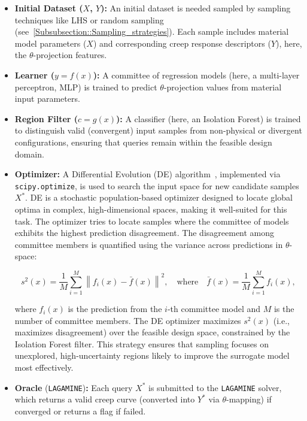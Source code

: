 \documentclass[class=scrbook, crop=false]{standalone}
\begin{document}
	\begin{itemize}
		\item \textbf{Initial Dataset ($X$, $Y$):} An initial dataset is needed sampled by sampling techniques like LHS or random sampling (see~\ref{Subsubsection::Sampling_strategies}). Each sample includes material model parameters ($X$) and corresponding creep response descriptors ($Y$), here, the $\theta$-projection features.	
		
		\item \textbf{Learner ($y = f(x)$):} A committee of regression models (here, a multi-layer perceptron, MLP) is trained to predict $\theta$-projection values from material input parameters.
		
		\item \textbf{Region Filter ($c = g(x)$):} A classifier (here, an Isolation Forest) is trained to distinguish valid (convergent) input samples from non-physical or divergent configurations, ensuring that queries remain within the feasible design domain.
		
		\item \textbf{Optimizer:} A Differential Evolution (DE) algorithm~\cite{storn1997differential}, implemented via \texttt{scipy.optimize}, is used to search the input space for new candidate samples $X^*$. DE is a stochastic population-based optimizer designed to locate global optima in complex, high-dimensional spaces, making it well-suited for this task. The optimizer tries to locate samples where the committee of models exhibits the highest prediction disagreement. The disagreement among committee members is quantified using the variance across predictions in $\theta$-space:
		
		\begin{equation}
			s^2(x) = \frac{1}{M} \sum_{i=1}^M \left\| f_i(x) - \bar{f}(x) \right\|^2, \quad \text{where} \quad \bar{f}(x) = \frac{1}{M} \sum_{i=1}^M f_i(x),
		\end{equation}
		
		where $f_i(x)$ is the prediction from the $i$-th committee model and $M$ is the number of committee members. The DE optimizer maximizes \( s^2(x) \) (i.e., maximizes disagreement) over the feasible design space, constrained by the Isolation Forest filter.	This strategy ensures that sampling focuses on unexplored, high-uncertainty regions likely to improve the surrogate model most effectively.
		
		\item \textbf{Oracle} (\texttt{LAGAMINE})\textbf{:} Each query $X^*$ is submitted to the \texttt{LAGAMINE} solver, which returns a valid creep curve (converted into $Y^*$ via $\theta$-mapping) if converged or returns a flag if failed.
		

\end{itemize}
\end{document}
